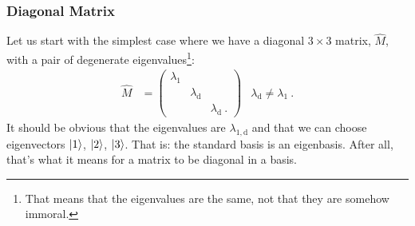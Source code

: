 \documentclass[12pt, oneside]{report}    %
\begin{document}
\subsubsection*{Diagonal Matrix}

Let us start with the simplest case where we have a diagonal $3\times 3$ matrix, $\hat M$, with a pair of degenerate eigenvalues\footnote{That means that the eigenvalues are the same, not that they are somehow immoral.}:
\begin{align} 
    \hat M &= 
    \begin{pmatrix}
        \lambda_1 & & \\
        & \lambda_\text{d} & \\
        & & \lambda_\text{d} \ .
    \end{pmatrix}
    &
    \lambda_\text{d}  \neq \lambda_1\ .
    \label{eq:degenerate:eigenvalue:diagonal}
\end{align}
It should be obvious that the eigenvalues are $\lambda_{1,\text{d}}$ and that we can choose eigenvectors $\left|1\right\rangle$, $\left|2\right\rangle$, $\left|3\right\rangle$. That is: the standard basis is an eigenbasis. After all, that's what it means for a matrix to be diagonal in a basis. 
\end{document}
